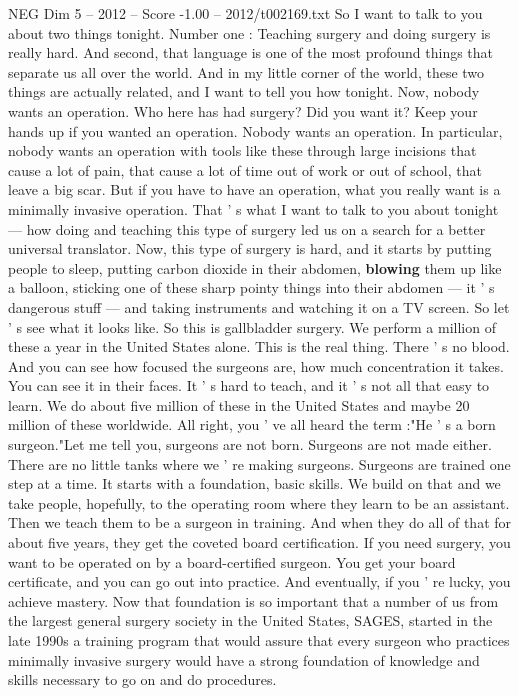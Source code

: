 \begin{textsample}{NEG Dim 5 – 2012 – Score -1.00 – 2012/t002169.txt}  \label{ex:f5_neg_043}
So I want to talk to you about two things tonight.
Number one : Teaching surgery and doing surgery is really hard.
And second, that language is one of the most profound things that separate us all over the world.
And in my little corner of the world, these two things are actually related, and I want to tell you how tonight.
Now, nobody wants an operation.
Who here has had surgery?
Did you want it?
Keep your hands up if you wanted an operation.
Nobody wants an operation.
In particular, nobody wants an operation with tools like these through large incisions that cause a lot of pain, that cause a lot of time out of work or out of school, that leave a big scar.
But if you have to have an operation, what you really want is a minimally invasive operation.
That ' s what I want to talk to you about tonight — how doing and teaching this type of surgery led us on a search for a better universal translator.
Now, this type of surgery is hard, and it starts by putting people to sleep, putting carbon dioxide in their abdomen, \textbf{blowing} them up like a balloon, sticking one of these sharp pointy things into their abdomen — it ' s dangerous stuff — and taking instruments and watching it on a TV screen.
So let ' s see what it looks like.
So this is gallbladder surgery.
We perform a million of these a year in the United States alone.
This is the real thing.
There ' s no blood.
And you can see how focused the surgeons are, how much concentration it takes.
You can see it in their faces.
It ' s hard to teach, and it ' s not all that easy to learn.
We do about five million of these in the United States and maybe 20 million of these worldwide.
All right, you ' ve all heard the term :"He ' s a born surgeon."Let me tell you, surgeons are not born.
Surgeons are not made either.
There are no little tanks where we ' re making surgeons.
Surgeons are trained one step at a time.
It starts with a foundation, basic skills.
We build on that and we take people, hopefully, to the operating room where they learn to be an assistant.
Then we teach them to be a surgeon in training.
And when they do all of that for about five years, they get the coveted board certification.
If you need surgery, you want to be operated on by a board-certified surgeon.
You get your board certificate, and you can go out into practice.
And eventually, if you ' re lucky, you achieve mastery.
Now that foundation is so important that a number of us from the largest general surgery society in the United States, SAGES, started in the late 1990s a training program that would assure that every surgeon who practices minimally invasive surgery would have a strong foundation of knowledge and skills necessary to go on and do procedures.

\end{textsample}
